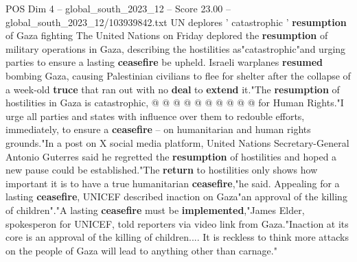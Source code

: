 \begin{textsample}{POS Dim 4 – global\_south\_2023\_12 – Score 23.00 – global\_south\_2023\_12/103939842.txt}
UN deplores ' catastrophic ' \textbf{resumption} of Gaza fighting The United Nations on Friday deplored the \textbf{resumption} of military operations in Gaza, describing the hostilities as"catastrophic"and urging parties to ensure a lasting \textbf{ceasefire} be upheld.
Israeli warplanes \textbf{resumed} bombing Gaza, causing Palestinian civilians to flee for shelter after the collapse of a week-old \textbf{truce} that ran out with no \textbf{deal} to \textbf{extend} it."The \textbf{resumption} of hostilities in Gaza is catastrophic, @ @ @ @ @ @ @ @ @ @ for Human Rights."I urge all parties and states with influence over them to redouble efforts, immediately, to ensure a \textbf{ceasefire} -- on humanitarian and human rights grounds."In a post on X social media platform, United Nations Secretary-General Antonio Guterres said he regretted the \textbf{resumption} of hostilities and hoped a new pause could be established."The \textbf{return} to hostilities only shows how important it is to have a true humanitarian \textbf{ceasefire},"he said.
Appealing for a lasting \textbf{ceasefire}, UNICEF described inaction on Gaza"an approval of the killing of children"."A lasting \textbf{ceasefire} must be \textbf{implemented},"James Elder, spokesperon for UNICEF, told reporters via video link from Gaza."Inaction at its core is an approval of the killing of children....
It is reckless to think more attacks on the people of Gaza will lead to anything other than carnage."

\end{textsample}
